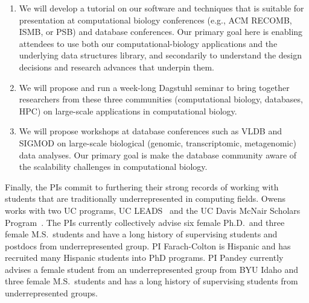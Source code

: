 \begin{enumerate}%
  \item We will develop a tutorial on our software and techniques that is suitable for presentation at computational biology conferences (e.g., ACM RECOMB, ISMB, or PSB) and database conferences. Our primary goal here is enabling attendees to use both our computational-biology applications and the underlying data structures library, and secondarily to understand the design decisions and research advances that underpin them.
  \item We will propose and run a week-long Dagstuhl seminar to bring together researchers from these three communities (computational biology, databases, HPC) on large-scale applications in computational biology.
  \item We will propose workshops at database conferences such as VLDB and SIGMOD on large-scale biological (genomic, transcriptomic, metagenomic) data analyses. Our primary goal is make the database community aware of the scalability challenges in computational biology. 
\end{enumerate}

Finally, the PIs commit to furthering their strong records of working with students that are traditionally underrepresented in computing fields. Owens works with two UC programs, UC LEADS~\cite{UCLeads:2003:WEB} and the UC Davis McNair Scholars Program~\cite{McNair:2003:WEB}.  The PIs currently collectively advise six female Ph.D.\ and three female M.S.\ students and have a long history of supervising students and postdocs from underrepresented group.
PI Farach-Colton is Hispanic and has recruited many Hispanic students into PhD programs. PI Pandey currently advises a female student from an underrepresented group from BYU Idaho and three female M.S.\ students and has a long history of supervising students from underrepresented groups.  
